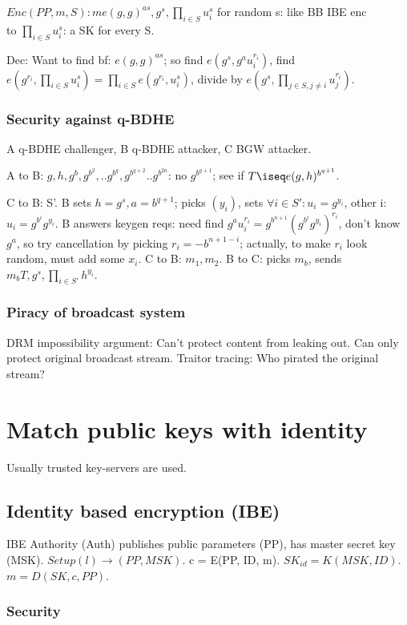 \documentclass[oneside, article]{memoir}
\begin{document}
$Enc(PP,m,S): me(g,g)^{as}, g^{s}, \prod_{i \in S} u_{i}^{s}$ for random s: like BB IBE enc \\
to $\prod_{i \in S} u_{i}^{s}$: a SK for every S.

Dec: Want to find bf: $e(g,g)^{as}$; so find $e(g^{s},g^{a}u_{i}^{r_{i}})$, find $e(g^{r_{i}}, \prod_{i \in S} u_{i}^{s}) = \prod_{i \in S}e(g^{r_{i}}, u_{i}^{s})$, divide by $e(g^{s}, \prod_{j \in S, j \neq i} u_{j}^{r_{i}})$.

\subsection{Security against q-BDHE}
A q-BDHE challenger, B q-BDHE attacker, C BGW attacker.

A to B: $g, h, g^{b}, g^{b^{2}}, .. g^{b^{q}}, g^{b^{q+2}} .. g^{b^{2a}}$:
 no $g^{b^{q+1}}$; see if $T \iseq e(g,h)^{b^{q+1}}$.
 
 C to B: S'. B sets $h = g^{s}, a = b^{q+1}$; picks $(y_{i})$, sets $\forall i\in S': u_{i} = g^{y_{i}}$, other i: $u_{i} = g^{b^{i}}g^{y_{i}}$. B answers keygen reqs: need find $g^{a}u_{i}^{r_{i}} = g^{b^{n+1}}(g^{b^{i}}g^{y_{i}})^{r_{i}}$, don't know $g^{a}$, so try cancellation by picking $r_{i} = -b^{n+1-i}$; actually, to make $r_{i}$ look random, must add some $x_{i}$. C to B: $m_{1}, m_{2}$. B to C: picks $m_{b}$, sends $m_{b}T, g^{s}, \prod_{i \in S'}h^{y_{i}}$.

\subsection{Piracy of broadcast system}
DRM impossibility argument: Can't protect content from leaking out. Can only protect original broadcast stream. Traitor tracing: Who pirated the original stream?

\chapter{Match public keys with identity}
Usually trusted key-servers are used.

\section{Identity based encryption (IBE)}
IBE Authority (Auth) publishes public parameters (PP), has master secret key (MSK). $Setup(l) \to (PP, MSK)$. c = E(PP, ID, m). $SK_{id} = K(MSK, ID)$. $m = D(SK, c, PP)$.

\subsection{Security}
\end{document}
